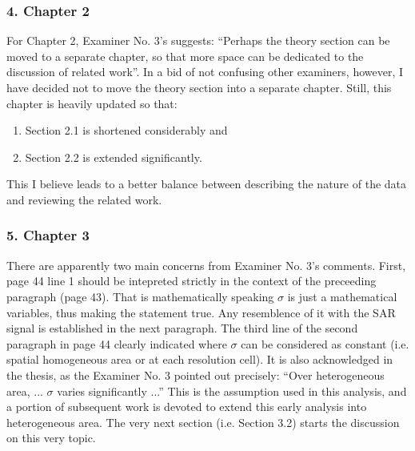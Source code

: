\subsubsection*{4. Chapter 2}

For Chapter 2, Examiner No. 3's suggests: ``Perhaps the theory section can be moved to a separate chapter, so that more space can be dedicated to the discussion of related work''.
In a bid of not confusing other examiners, however, I have decided not to move the theory section into a separate chapter.
Still, this chapter is heavily updated so that: 
\vspace{-3mm}
\begin{enumerate}
  \item Section 2.1 is shortened considerably and 
  \item Section 2.2 is extended significantly. 
\end{enumerate}

This I believe leads to a better balance between describing the nature of the data and reviewing the related work.

\subsubsection*{5. Chapter 3}

There are apparently two main concerns from Examiner No. 3's comments.
First, page 44 line 1 should be intepreted strictly in the context of the preceeding paragraph (page 43). 
That is mathematically  speaking $\sigma$ is just a mathematical variables, thus making the statement true. 
Any resemblence of it with the SAR signal is established in the next paragraph.
The third line of the second paragraph in page 44 clearly indicated where $\sigma$ can be considered as constant (i.e. spatial homogeneous area or at each resolution cell).
It is also acknowledged in the thesis, as the Examiner No. 3 pointed out precisely: ``Over heterogeneous area, ... $\sigma$ varies significantly ...''
This is the assumption used in this analysis, 
  and a portion of subsequent work is devoted to extend this early analysis into heterogeneous area.
The very next section (i.e. Section 3.2) starts the discussion on this very topic.  


